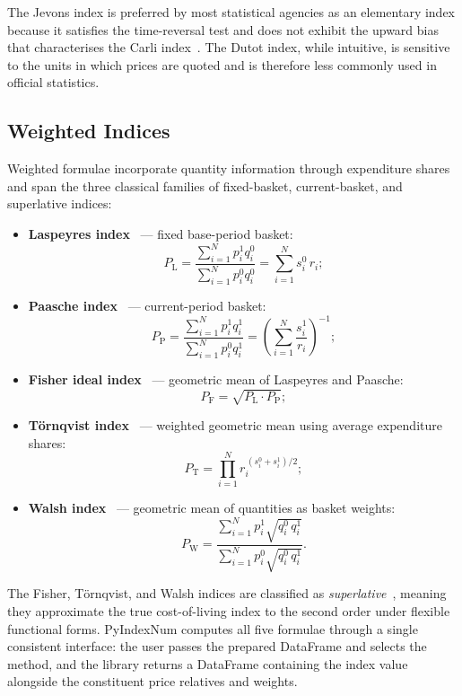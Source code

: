 \documentclass[12pt,a4paper]{article}
\begin{document}
The Jevons index is preferred by most statistical agencies as an elementary index because it satisfies the time-reversal test and does not exhibit the upward bias that characterises the Carli index~\autocite{levell2015carli}. The Dutot index, while intuitive, is sensitive to the units in which prices are quoted and is therefore less commonly used in official statistics.

\subsection{Weighted Indices}

Weighted formulae incorporate quantity information through expenditure shares and span the three classical families of fixed-basket, current-basket, and superlative indices:

\begin{itemize}[nosep]
  \item \textbf{Laspeyres index}~\autocite{laspeyres1871index} --- fixed base-period basket:
    \[
      P_{\mathrm{L}} = \frac{\sum_{i=1}^{N} p_i^1 q_i^0}{\sum_{i=1}^{N} p_i^0 q_i^0}
                     = \sum_{i=1}^{N} s_i^0 \, r_i;
    \]
  \item \textbf{Paasche index}~\autocite{paasche1874preis} --- current-period basket:
    \[
      P_{\mathrm{P}} = \frac{\sum_{i=1}^{N} p_i^1 q_i^1}{\sum_{i=1}^{N} p_i^0 q_i^1}
                     = \left(\sum_{i=1}^{N} \frac{s_i^1}{r_i}\right)^{-1};
    \]
  \item \textbf{Fisher ideal index}~\autocite{fisher1922book} --- geometric mean of Laspeyres and Paasche:
    \[
      P_{\mathrm{F}} = \sqrt{P_{\mathrm{L}} \cdot P_{\mathrm{P}}};
    \]
  \item \textbf{Törnqvist index}~\autocite{tornqvist1936bank} --- weighted geometric mean using average expenditure shares:
    \[
      P_{\mathrm{T}} = \prod_{i=1}^{N} r_i^{\,(s_i^0 + s_i^1)/2};
    \]
  \item \textbf{Walsh index}~\autocite{walsh1901measurement} --- geometric mean of quantities as basket weights:
    \[
      P_{\mathrm{W}} = \frac{\sum_{i=1}^{N} p_i^1 \sqrt{q_i^0 \, q_i^1}}{\sum_{i=1}^{N} p_i^0 \sqrt{q_i^0 \, q_i^1}}.
    \]
\end{itemize}

The Fisher, Törnqvist, and Walsh indices are classified as \emph{superlative}~\autocite{diewert1976exact}, meaning they approximate the true cost-of-living index to the second order under flexible functional forms. PyIndexNum computes all five formulae through a single consistent interface: the user passes the prepared DataFrame and selects the method, and the library returns a DataFrame containing the index value alongside the constituent price relatives and weights.
\end{document}
